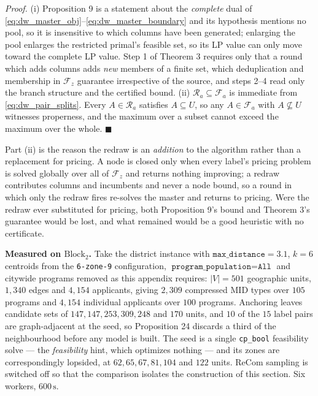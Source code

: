 \documentclass{article}
\begin{document}
\textit{Proof.} (i) Proposition 9 is a statement about the \emph{complete} dual
of \eqref{eq:dw_master_obj}--\eqref{eq:dw_master_boundary} and its hypothesis
mentions no pool, so it is insensitive to which columns have been generated;
enlarging the pool enlarges the restricted primal's feasible set, so its LP
value can only move toward the complete LP value. Step 1 of Theorem 3 requires
only that a round which adds columns adds \emph{new} members of a finite set,
which deduplication and membership in $\mathcal F_z$ guarantee irrespective of
the source, and steps 2--4 read only the branch structure and the certified
bound. (ii) $\mathcal R_a \subseteq \mathcal F_a$ is immediate from
\eqref{eq:dw_pair_splits}. Every $A \in \mathcal R_a$ satisfies $A \subseteq U$,
so any $A \in \mathcal F_a$ with $A \not\subseteq U$ witnesses properness, and
the maximum over a subset cannot exceed the maximum over the whole.
$\blacksquare$

Part (ii) is the reason the redraw is an \emph{addition} to the algorithm rather
than a replacement for pricing. A node is closed only when every label's
pricing problem is solved globally over all of $\mathcal F_z$ and returns
nothing improving; a redraw contributes columns and incumbents and never a node
bound, so a round in which only the redraw fires re-solves the master and
returns to pricing. Were the redraw ever substituted for pricing, both
Proposition 9's bound and Theorem 3's guarantee would be lost, and what remained
would be a good heuristic with no certificate.

\noindent\textbf{Measured on $\text{Block}_2$.} Take the district instance with
$\texttt{max\_distance} = 3.1$, $k = 6$ centroids from the \texttt{6-zone-9}
configuration, $\texttt{program\_population} = \texttt{All}$ and citywide
programs removed as this appendix requires: $|V| = 501$ geographic units,
$1{,}340$ edges and $4{,}154$ applicants, giving $2{,}309$ compressed MID types
over $105$ programs and $4{,}154$ individual applicants over $100$ programs.
Anchoring leaves candidate sets of $147, 147, 253, 309, 248$ and $170$ units,
and $10$ of the $15$ label pairs are graph-adjacent at the seed, so
Proposition 24 discards a third of the neighbourhood before any model is built.
The seed is a single \texttt{cp\_bool} feasibility solve --- the
\emph{feasibility} hint, which optimizes nothing --- and its zones are
correspondingly lopsided, at $62, 65, 67, 81, 104$ and $122$ units. ReCom
sampling is switched off so that the comparison isolates the construction of
this section. Six workers, $600\,\mathrm{s}$.
\end{document}
